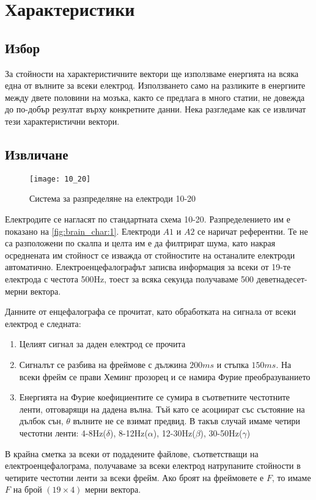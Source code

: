 \documentclass[main.tex]{subfiles}
\begin{document}
\section{Характеристики}
\label{chap_brain_char}

\subsection{Избор}
За стойности на характеристичните вектори ще използваме енергията на всяка една от вълните за всеки електрод. Използването само на разликите в енергиите между двете половини на мозъка, както се предлага в много статии, не довежда до по-добър резултат върху конкретните данни. Нека разгледаме как се извличат тези характеристични вектори.

\subsection{Извличане}

\begin{minipage}{0.45\textwidth}
        \begin{figure}[H]
                \texttt{[image: 10\_20]}
                \caption{Система за разпределяне на електроди 10-20}
                \label{fig:brain_char:1}
        \end{figure}
\end{minipage} \hfill
\begin{minipage}{0.45\textwidth}
        Електродите се нагласят по стандартната схема 10-20. Разпределението им е показано на \autoref{fig:brain_char:1}. Електроди $A1$ и $A2$ се наричат референтни. Те не са разположени по скалпа и целта им е да филтрират шума, като накрая осреднената им стойност се изважда от стойностите на останалите електроди автоматично. Електроенцефалографът записва информация за всеки от 19-те електрода с честота 500Hz, тоест за всяка секунда получаваме 500 деветнадесет-мерни вектора.
\end{minipage}
Данните от енцефалографа се прочитат, като обработката на сигнала от всеки електрод е следната:
\begin{enumerate}
        \item Целият сигнал за даден електрод се прочита
        \item Сигналът се разбива на фреймове с дължина $200ms$ и стъпка $150ms$. На всеки фрейм се прави Хеминг прозорец и се намира Фурие преобразуванието
        \item Енергията на Фурие коефициентите се сумира в съответните честотните ленти, отговарящи на дадена вълна. Тъй като се асоциират със състояние на дълбок сън, $\theta$ вълните не се взимат предвид. В такъв случай имаме четири честотни ленти: 4-8Hz($\delta$), 8-12Hz($\alpha$), 12-30Hz($\beta$), 30-50Hz($\gamma$)
\end{enumerate}
В крайна сметка за всеки от подадените файлове, съответстващи на електроенцефалограма, получаваме за всеки електрод натрупаните стойности в четирите честотни ленти за всеки фрейм. Ако броят на фреймовете е $F$, то имаме $F$ на брой $(19\times4)$ мерни вектора.
\end{document}
